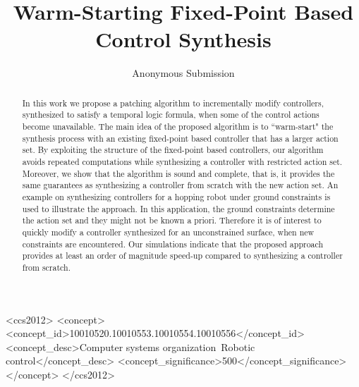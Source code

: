 \documentclass[sigconf]{acmart}
\begin{document}
\title{Warm-Starting Fixed-Point Based Control Synthesis}


\author{Anonymous Submission}

\renewcommand{\shortauthors}{Anonymous et al.}


\begin{abstract}
 In this work we propose a patching algorithm to incrementally modify controllers, synthesized to satisfy a temporal logic formula, when some of the control actions become unavailable. The main idea of the proposed algorithm is to ``warm-start" the synthesis process with an existing fixed-point based controller that has a larger action set. 
By exploiting the structure of the fixed-point based controllers, our algorithm avoids repeated computations while synthesizing a controller with restricted action set. Moreover, we show that the algorithm is sound and complete, that is, it provides the same guarantees as synthesizing a controller from scratch with the new action set.    
An example on synthesizing controllers for a hopping robot under ground constraints is used to illustrate the approach. In this application, the ground constraints determine the action set and they might not be known a priori. Therefore it is of interest to quickly modify a controller synthesized for an unconstrained surface, when new constraints are encountered. Our simulations indicate that the proposed approach provides at least an order of magnitude speed-up compared to synthesizing a controller from scratch.
\end{abstract}

%
%
\begin{CCSXML}
<ccs2012>
<concept>
<concept_id>10010520.10010553.10010554.10010556</concept_id>
<concept_desc>Computer systems organization~Robotic control</concept_desc>
<concept_significance>500</concept_significance>
</concept>
</ccs2012>
\end{CCSXML}






\maketitle





\end{document}
